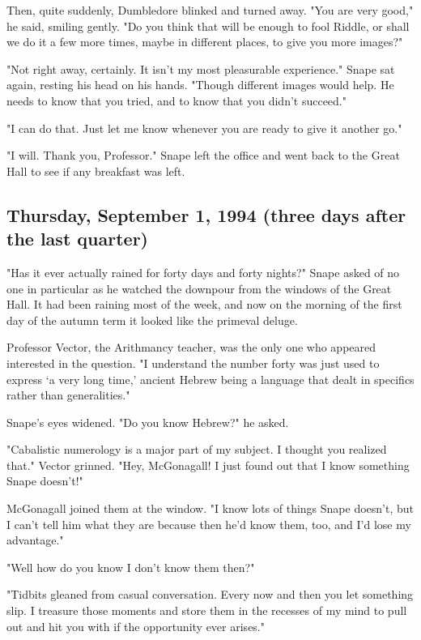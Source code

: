Then, quite suddenly, Dumbledore blinked and turned away. "You are very good," he said, smiling gently. "Do you think that will be enough to fool Riddle, or shall we do it a few more times, maybe in different places, to give you more images?"

"Not right away, certainly. It isn't my most pleasurable experience." Snape sat again, resting his head on his hands. "Though different images would help. He needs to know that you tried, and to know that you didn't succeed."

"I can do that. Just let me know whenever you are ready to give it another go."

"I will. Thank you, Professor." Snape left the office and went back to the Great Hall to see if any breakfast was left.

\subsection{Thursday, September 1, 1994 (three days after the last quarter)}

"Has it ever actually rained for forty days and forty nights?" Snape asked of no one in particular as he watched the downpour from the windows of the Great Hall. It had been raining most of the week, and now on the morning of the first day of the autumn term it looked like the primeval deluge.

Professor Vector, the Arithmancy teacher, was the only one who appeared interested in the question. "I understand the number forty was just used to express `a very long time,' ancient Hebrew being a language that dealt in specifics rather than generalities."

Snape's eyes widened. "Do you know Hebrew?" he asked.

"Cabalistic numerology is a major part of my subject. I thought you realized that." Vector grinned. "Hey, McGonagall! I just found out that I know something Snape doesn't!"

McGonagall joined them at the window. "I know lots of things Snape doesn't, but I can't tell him what they are because then he'd know them, too, and I'd lose my advantage."

"Well how do you know I don't know them then?"

"Tidbits gleaned from casual conversation. Every now and then you let something slip. I treasure those moments and store them in the recesses of my mind to pull out and hit you with if the opportunity ever arises."

